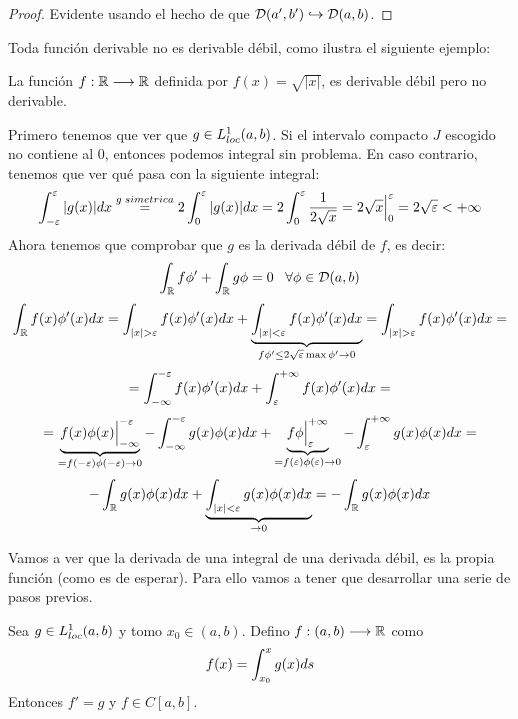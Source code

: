 \begin{proof}
Evidente usando el hecho de que $\mathcal{D}(a',b')\hookrightarrow\mathcal{D}(a,b)$.
\end{proof}

Toda función derivable no es derivable débil, como ilustra el siguiente ejemplo:

\begin{example}
La función $f : \mathbb{R} \longrightarrow \mathbb{R}$ definida por $f(x)=\sqrt{|x|}$, es derivable débil pero no derivable.

Primero tenemos que ver que $g\in L^1_{loc}(a,b)$. Si el intervalo compacto $J$ escogido no contiene al 0, entonces podemos integral sin problema. En caso contrario, tenemos que ver qué pasa con la siguiente integral:
\[
\displaystyle\int_{ -\varepsilon }^{ \varepsilon } |g(x)|dx\overset{g\; simetrica}{=}2\displaystyle\int_{ 0 }^{ \varepsilon } |g(x)|dx=2\displaystyle\int_{ 0 }^{ \varepsilon } \frac{1}{2\sqrt{x}}=2\sqrt{x}\Big|_0^\varepsilon=2\sqrt{\varepsilon}<+\infty
\]
Ahora tenemos que comprobar que $g$ es la derivada débil de $f$, es decir:
\[
\displaystyle\int_{ \mathbb{R} }^{  } f\phi'+\displaystyle\int_{ \mathbb{R} }^{  } g\phi=0 \;\;\; \forall\phi\in\mathcal{D}(a,b)
\]
\[
\integral{\R}{}{f(x)\phi'(x)dx}=\integral{|x|>\varepsilon}{}{f(x)\phi'(x)dx}+\underbrace{\integral{|x|<\varepsilon}{}{f(x)\phi'(x)dx}}_{f\phi'\leq2\sqrt{\varepsilon}\max\phi'\to0}=\integral{|x|>\varepsilon}{}{f(x)\phi'(x)dx}=
\]
\[
=\displaystyle\int_{ -\infty }^{ -\varepsilon } f(x)\phi'(x)dx+\displaystyle\int_{ \varepsilon }^{ +\infty } f(x)\phi'(x)dx=
\]
\[
=\underbrace{f(x)\phi(x)\Big|_{-\infty}^{-\varepsilon}}_{=f(-\varepsilon)\phi(-\varepsilon)\to 0}-
\displaystyle\int_{ -\infty }^{ -\varepsilon } g(x)\phi(x) dx+
\underbrace{f\phi\Big|_{\varepsilon}^{+\infty}}_{{=f(\varepsilon)\phi(\varepsilon)\to 0}}-
\displaystyle\int_{ \varepsilon }^{ +\infty } g(x)\phi(x) dx=
\]
\[
-\displaystyle\int_{ \mathbb{R} }^{  } g(x)\phi(x)dx+\underbrace{\displaystyle\int_{ |x|<\varepsilon }^{  } g(x)\phi(x)dx}_{\to0}=-\displaystyle\int_{ \mathbb{R} }^{  } g(x)\phi(x)dx
\]
\end{example}

Vamos a ver que la derivada de una integral de una derivada débil, es la propia función (como es de esperar). Para ello vamos a tener que desarrollar una serie de pasos previos.

\begin{prop}
Sea $g\in L^1_{loc}(a,b)$ y tomo $x_0\in(a,b)$. Defino $f : (a,b) \longrightarrow \mathbb{R}$ como
\[
f(x)=\displaystyle\int_{ x_0 }^{ x } g(x)ds
\]
Entonces $f'=g$ y $f\in C[a,b]$.
\end{prop}


